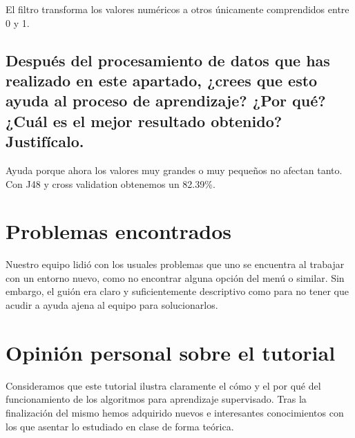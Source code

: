 \documentclass[12pt]{article}
\begin{document}
El filtro transforma los valores numéricos a otros únicamente comprendidos entre 0 y 1.

\subsection*{\small Después del procesamiento de datos que has realizado en este apartado, ¿crees que esto ayuda al proceso de aprendizaje? ¿Por qué? ¿Cuál es el mejor resultado obtenido? Justifícalo.}

Ayuda porque ahora los valores muy grandes o muy pequeños no afectan tanto. Con J48 y cross validation obtenemos un 82.39\%.

\section{Problemas encontrados}

Nuestro equipo lidió con los usuales problemas que uno se encuentra al trabajar con un entorno nuevo, como no encontrar alguna opción del menú o similar. Sin embargo, el guión era claro y suficientemente descriptivo como para no tener que acudir a ayuda ajena al equipo para solucionarlos.

\section{Opinión personal sobre el tutorial}

Consideramos que este tutorial ilustra claramente el cómo y el por qué del funcionamiento de los algoritmos para aprendizaje supervisado. Tras la finalización del mismo hemos adquirido nuevos e interesantes conocimientos con los que asentar lo estudiado en clase de forma teórica.
\end{document}
